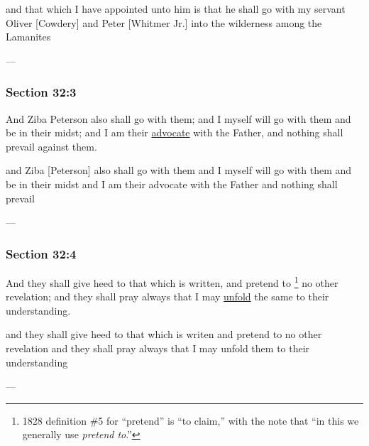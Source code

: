 		\begin{framed}
		\scriptsize
			\begin{compactdesc}
				\item[JSP] and that which I have appointed unto him is that he shall go with my servant Oliver [Cowdery] and Peter [Whitmer Jr.] into the wilderness among the Lamanites
				\item[BC] ---
			\end{compactdesc}
		\end{framed}

	\subsubsection{Section 32:3} %
		\label{DC32-3}

		And Ziba Peterson also shall go with them; and I myself will go with them and be in their midst; and I am their \hyperref[ADVOCATE]{advocate} with the Father, and nothing shall prevail against them.

		\begin{framed}
		\scriptsize
			\begin{compactdesc}
				\item[JSP] and Ziba [Peterson] also shall go with them and I myself will go with them and be in their midst and I am their advocate with the Father and nothing shall prevail
				\item[BC] ---
			\end{compactdesc}
		\end{framed}

	\subsubsection{Section 32:4} %
		\label{DC32-4}

		And they shall give heed to that which is written, and pretend to%
			\footnote{%
				1828 definition \#5 for ``pretend'' is ``to claim,'' with the note that ``in this we generally use \textit{pretend to}.''
				}
		no other revelation; and they shall pray always that I may \hyperref[UNFOLD]{unfold} the same to their understanding.

		\begin{framed}
		\scriptsize
			\begin{compactdesc}
				\item[JSP] and they shall give heed to that which is writen and pretend to no other revelation and they shall pray always that I may unfold them to their understanding
				\item[BC] ---
			\end{compactdesc}
		\end{framed}

